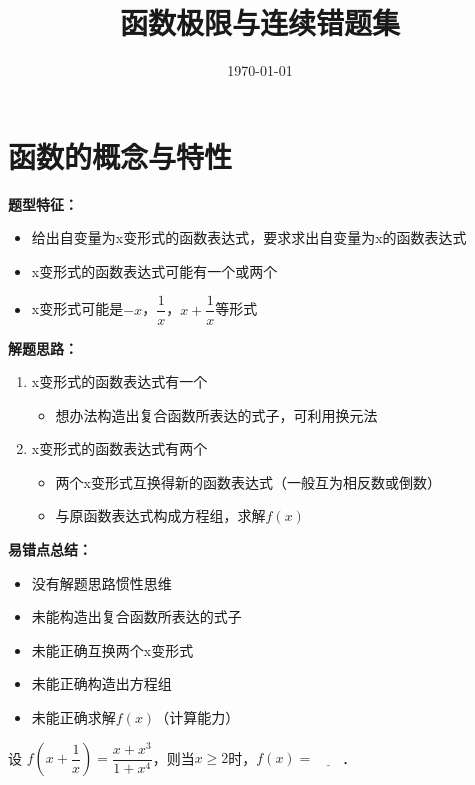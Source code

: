 \documentclass{ctexart}
\title{函数极限与连续错题集}
\date{\today}
\begin{document}
\maketitle

\section{函数的概念与特性}

\begin{strategy}[求函数]
\textbf{题型特征：}
\begin{itemize}
    \item 给出自变量为x变形式的函数表达式，要求求出自变量为x的函数表达式
    \item x变形式的函数表达式可能有一个或两个
    \item x变形式可能是$-x$，$\dfrac{1}{x}$，$x+\dfrac{1}{x}$等形式
\end{itemize}

\textbf{解题思路：}
\begin{enumerate}
    \item x变形式的函数表达式有一个
    \begin{itemize}
        \item 想办法构造出复合函数所表达的式子，可利用换元法
    \end{itemize}
    
    \item x变形式的函数表达式有两个
    \begin{itemize}
        \item 两个x变形式互换得新的函数表达式（一般互为相反数或倒数）
        \item 与原函数表达式构成方程组，求解$f(x)$
    \end{itemize}
    
\end{enumerate}

\textbf{易错点总结：}
\begin{itemize}
    \item 没有解题思路惯性思维
    \item 未能构造出复合函数所表达的式子
    \item 未能正确互换两个x变形式
    \item 未能正确构造出方程组
    \item 未能正确求解$f(x)$（计算能力）
\end{itemize}
\end{strategy}

\newproblem

\begin{problem}[单x变形式求函数]
设 $f\left(x+\dfrac{1}{x}\right) = \dfrac{x+x^{3}}{1+x^{4}}$，则当$x\geqslant2$时，$f(x)=\underline{\qquad}$．

\end{problem}
\end{document}

